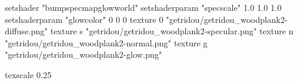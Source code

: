 setshader "bumpspecmapglowworld"
setshaderparam "specscale" 1.0 1.0 1.0
setshaderparam "glowcolor" 0 0 0
texture 0 "getridou/getridou_woodplank2-diffuse.png"
texture s "getridou/getridou_woodplank2-specular.png"
texture n "getridou/getridou_woodplank2-normal.png"
texture g "getridou/getridou_woodplank2-glow.png"

texscale 0.25